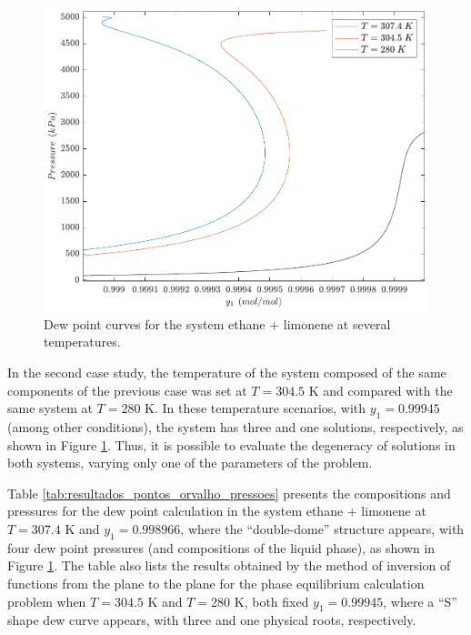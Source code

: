 \documentclass[journal=iecred,manuscript=article]{achemso}
\theoremstyle{definition}
\theoremstyle{remark}
\begin{document}
\begin{figure}
	\begin{center}
		\includegraphics[scale=0.50]{curvas_ponto_orvalho.pdf}
		\caption{Dew point curves for the system ethane + limonene at several temperatures.}\label{fig:dew_point_curve}
	\end{center}
\end{figure}

In the second case study,  the temperature of the system composed of the same components of the previous case was set at  $ T = 304.5 $ K and compared with the same system at $T = 280$ K. In these temperature scenarios, with $ y_1 = 0.99945 $ (among other conditions), the system has three and one solutions, respectively, as shown in Figure \ref{fig:dew_point_curve}. Thus, it is possible to evaluate the degeneracy of solutions in both systems, varying only one of the parameters of the problem.
 
Table \ref{tab:resultados_pontos_orvalho_pressoes} presents the compositions and pressures for the dew point calculation in the system ethane + limonene at $T = 307.4$ K and $y_{1} = 0.998966 $, where the \enquote{double-dome} structure appears, with four dew point pressures (and compositions of the liquid phase), as shown in Figure \ref{fig:dew_point_curve}. The table also lists the results obtained by the method of inversion of functions from the plane to the plane for the phase equilibrium calculation problem when $ T = 304.5 $ K and $ T = 280 $ K, both fixed $ y_{1} = 0.99945 $, where a \enquote{S} shape dew curve appears, with three and one physical roots, respectively.
\end{document}
